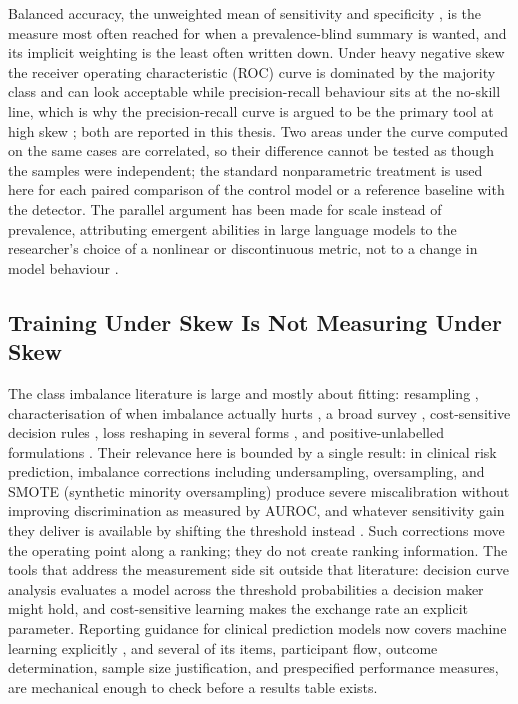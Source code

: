 Balanced accuracy, the unweighted mean of sensitivity and specificity \citep{brodersen2010balanced},
is the measure most often reached for when a prevalence-blind summary is wanted, and its implicit
weighting is the least often written down. Under heavy negative skew the receiver operating characteristic (ROC) curve is dominated by
the majority class and can look acceptable while precision-recall behaviour sits at the no-skill
line, which is why the precision-recall curve is argued to be the primary
tool at high skew \citep{saito2015prcurve}; both are reported in this thesis. Two areas under the curve computed on the same
cases are correlated, so their difference cannot be tested as though the samples were independent;
the standard nonparametric treatment \citep{delong1988comparing} is used here for each paired comparison of the control model or a reference baseline with the detector. The parallel argument has been made for scale instead of prevalence, attributing emergent abilities in large language models to the researcher's choice of a nonlinear or discontinuous metric, not to a change in model behaviour \citep{schaeffer2023mirage}.

\subsection{Training Under Skew Is Not Measuring Under Skew}

The class imbalance literature is large and mostly about fitting: resampling \citep{chawla2002smote},
characterisation of when imbalance actually hurts \citep{japkowicz2002imbalance}, a broad survey
\citep{he2009imbalanced}, cost-sensitive decision rules \citep{elkan2001cost}, loss reshaping in
several forms \citep{lin2017focal,cui2019classbalanced,cao2019ldam,menon2021logitadjust}, and
positive-unlabelled formulations \citep{bekker2020pu}. Their relevance here is bounded by a single
result: in clinical risk prediction, imbalance corrections
including undersampling, oversampling, and SMOTE (synthetic minority oversampling) produce severe miscalibration without improving
discrimination as measured by AUROC, and whatever sensitivity gain they deliver is available by
shifting the threshold instead \citep{vandengoorbergh2022harm}. Such corrections move the operating point along a ranking; they do
not create ranking information. The tools that address the measurement side sit outside that literature: decision curve analysis
\citep{vickers2006dca} evaluates a model across the threshold probabilities a decision maker might
hold, and cost-sensitive learning \citep{elkan2001cost} makes the exchange rate an explicit
parameter. Reporting guidance for clinical prediction models now covers machine learning explicitly
\citep{collins2024tripodai}, and several of its items, participant flow, outcome determination,
sample size justification, and prespecified performance measures, are mechanical enough to check
before a results table exists.

